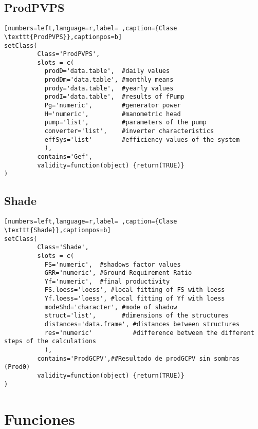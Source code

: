 \subsection{ProdPVPS}
\label{sec:org46a7271}
\label{subsec:claseprodpvps}
\begin{lstlisting}[numbers=left,language=r,label= ,caption={Clase \texttt{ProdPVPS}},captionpos=b]
setClass(
         Class='ProdPVPS',
         slots = c(
           prodD='data.table',  #daily values
           prodDm='data.table', #monthly means
           prody='data.table',  #yearly values
           prodI='data.table',  #results of fPump
           Pg='numeric',        #generator power
           H='numeric',         #manometric head
           pump='list',         #parameters of the pump
           converter='list',    #inverter characteristics
           effSys='list'        #efficiency values of the system
           ),
         contains='Gef',
         validity=function(object) {return(TRUE)}
)
\end{lstlisting}
\subsection{Shade}
\label{sec:org7ff4d6c}
\label{subsec:shade}
\begin{lstlisting}[numbers=left,language=r,label= ,caption={Clase \texttt{Shade}},captionpos=b]
setClass(
         Class='Shade',
         slots = c(
           FS='numeric',  #shadows factor values
           GRR='numeric', #Ground Requirement Ratio
           Yf='numeric',  #final productivity
           FS.loess='loess', #local fitting of FS with loess
           Yf.loess='loess', #local fitting of Yf with loess
           modeShd='character', #mode of shadow
           struct='list',       #dimensions of the structures
           distances='data.frame', #distances between structures
           res='numeric'           #difference between the different steps of the calculations
           ),
         contains='ProdGCPV',##Resultado de prodGCPV sin sombras (Prod0)
         validity=function(object) {return(TRUE)}
)
\end{lstlisting}
\section{Funciones}
\label{sec:org047ac8d}
\label{sec:funciones}
